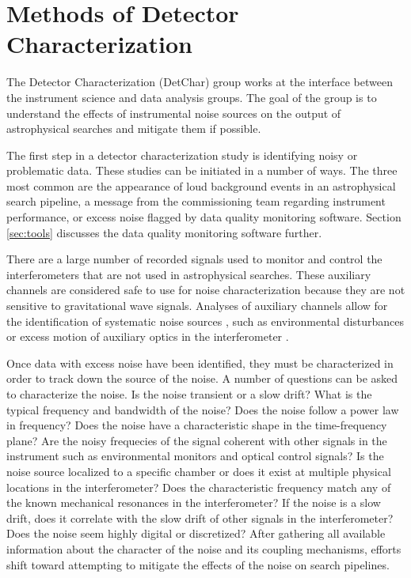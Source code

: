 \section{Methods of Detector Characterization}

The Detector Characterization (DetChar) group works at the interface 
between the instrument science and data analysis groups. The goal of 
the group is to understand the effects of instrumental noise sources on 
the output of astrophysical searches and mitigate them if possible.

The first step in a detector characterization study is identifying 
noisy or problematic data. These studies can be initiated in a number of ways. 
The three most common are the appearance of 
loud background events in an astrophysical search pipeline, a message from 
the commissioning team regarding instrument performance, or excess noise 
flagged by data quality monitoring software. Section \ref{sec:tools} discusses 
the data quality monitoring software further.

There are a large number of recorded signals used to monitor and control the
interferometers that are not used in astrophysical searches. These auxiliary
channels are considered safe to use for noise characterization because they are
not sensitive to gravitational wave signals. Analyses of auxiliary channels
allow for the identification of systematic noise sources \cite{Smith:2011,Isogai:2010},
such as environmental
disturbances \cite{Effler:2014zpa} or excess motion of auxiliary optics in the
interferometer \cite{GW150914-DETECTORS,InstrumentNoisePaper}. 

Once data with excess noise have been identified, they must be characterized 
in order to track down the source of the noise. A number of questions can 
be asked to characterize the noise. Is the noise transient or a slow 
drift? What is the typical frequency and bandwidth of the noise? Does the 
noise follow a power law in frequency? Does the 
noise have a characteristic shape in the time-frequency plane? Are the 
noisy frequecies of the signal coherent with other signals in the instrument 
such as environmental monitors and optical control signals? 
Is the noise source localized to a specific chamber or does it exist at 
multiple physical locations in the interferometer? Does the characteristic 
frequency match any of the known mechanical resonances in the interferometer? 
If the noise is a slow drift, does it correlate with the slow drift of 
other signals in the interferometer? Does the noise seem highly digital 
or discretized? After gathering all available information about the 
character of the noise and its coupling mechanisms, efforts shift 
toward attempting to mitigate the effects of the noise on search 
pipelines. 

